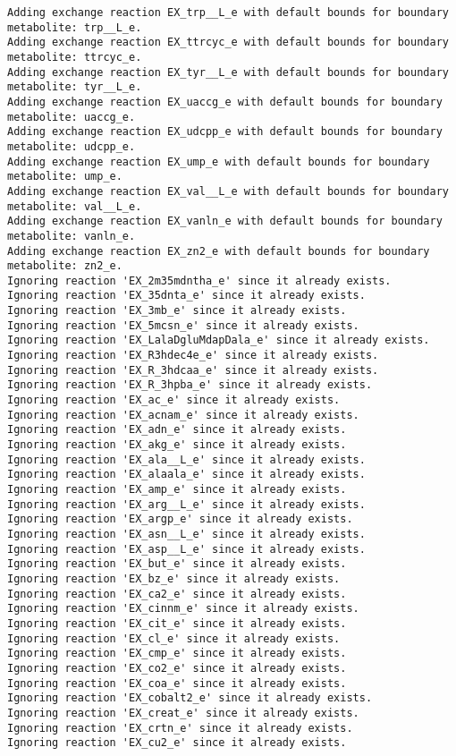\documentclass[
  letterpaper,
  DIV=11,
  numbers=noendperiod]{scrartcl}
\begin{document}
\begin{verbatim}
Adding exchange reaction EX_trp__L_e with default bounds for boundary metabolite: trp__L_e.
Adding exchange reaction EX_ttrcyc_e with default bounds for boundary metabolite: ttrcyc_e.
Adding exchange reaction EX_tyr__L_e with default bounds for boundary metabolite: tyr__L_e.
Adding exchange reaction EX_uaccg_e with default bounds for boundary metabolite: uaccg_e.
Adding exchange reaction EX_udcpp_e with default bounds for boundary metabolite: udcpp_e.
Adding exchange reaction EX_ump_e with default bounds for boundary metabolite: ump_e.
Adding exchange reaction EX_val__L_e with default bounds for boundary metabolite: val__L_e.
Adding exchange reaction EX_vanln_e with default bounds for boundary metabolite: vanln_e.
Adding exchange reaction EX_zn2_e with default bounds for boundary metabolite: zn2_e.
Ignoring reaction 'EX_2m35mdntha_e' since it already exists.
Ignoring reaction 'EX_35dnta_e' since it already exists.
Ignoring reaction 'EX_3mb_e' since it already exists.
Ignoring reaction 'EX_5mcsn_e' since it already exists.
Ignoring reaction 'EX_LalaDgluMdapDala_e' since it already exists.
Ignoring reaction 'EX_R3hdec4e_e' since it already exists.
Ignoring reaction 'EX_R_3hdcaa_e' since it already exists.
Ignoring reaction 'EX_R_3hpba_e' since it already exists.
Ignoring reaction 'EX_ac_e' since it already exists.
Ignoring reaction 'EX_acnam_e' since it already exists.
Ignoring reaction 'EX_adn_e' since it already exists.
Ignoring reaction 'EX_akg_e' since it already exists.
Ignoring reaction 'EX_ala__L_e' since it already exists.
Ignoring reaction 'EX_alaala_e' since it already exists.
Ignoring reaction 'EX_amp_e' since it already exists.
Ignoring reaction 'EX_arg__L_e' since it already exists.
Ignoring reaction 'EX_argp_e' since it already exists.
Ignoring reaction 'EX_asn__L_e' since it already exists.
Ignoring reaction 'EX_asp__L_e' since it already exists.
Ignoring reaction 'EX_but_e' since it already exists.
Ignoring reaction 'EX_bz_e' since it already exists.
Ignoring reaction 'EX_ca2_e' since it already exists.
Ignoring reaction 'EX_cinnm_e' since it already exists.
Ignoring reaction 'EX_cit_e' since it already exists.
Ignoring reaction 'EX_cl_e' since it already exists.
Ignoring reaction 'EX_cmp_e' since it already exists.
Ignoring reaction 'EX_co2_e' since it already exists.
Ignoring reaction 'EX_coa_e' since it already exists.
Ignoring reaction 'EX_cobalt2_e' since it already exists.
Ignoring reaction 'EX_creat_e' since it already exists.
Ignoring reaction 'EX_crtn_e' since it already exists.
Ignoring reaction 'EX_cu2_e' since it already exists.

\end{verbatim}
\end{document}
